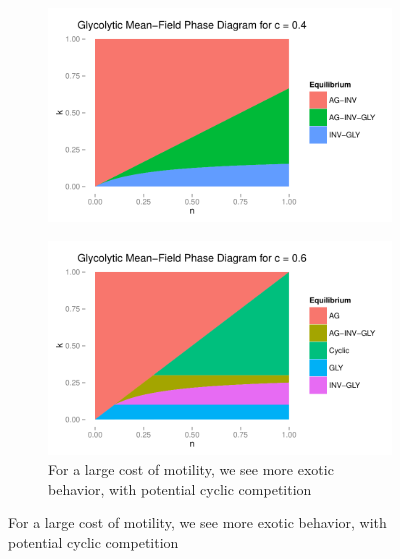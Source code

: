 \documentclass[12pt]{report}
\begin{document}
\begin{figure}[H]
\centering
\begin{subfigure}[b]{0.7 \textwidth}
	\centering
	\includegraphics[width = 0.9 \textwidth]{Diagrams/basanta_phase-mf_c-0_4}
	\caption{}
\end{subfigure}

\begin{subfigure}[b]{0.7 \linewidth}
\centering
\includegraphics[width = 0.9 \linewidth]{Diagrams/basanta_phase-mf_c-0_6}
\caption{For a large cost of motility, we see more exotic behavior, with potential cyclic competition }
\end{subfigure}
\end{figure}
\end{document}
